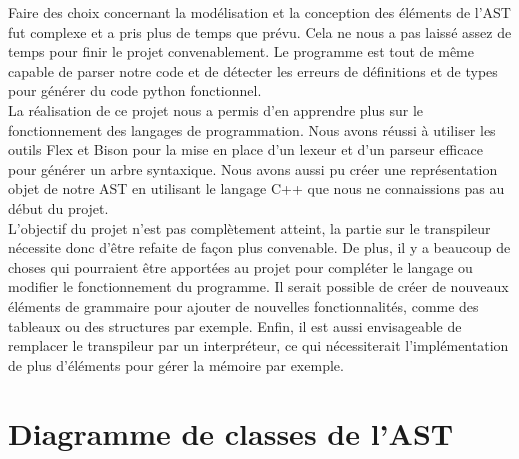 \documentclass[a4paper]{article}%
\begin{document}
Faire des choix concernant la modélisation et la conception des éléments de
l'AST fut complexe et a pris plus de temps que prévu. Cela ne nous a pas laissé
assez de temps pour finir le projet convenablement. Le programme est tout de
même capable de parser notre code et de détecter les erreurs de définitions et
de types pour générer du code python fonctionnel.\\

La réalisation de ce projet nous a permis d'en apprendre plus sur le
fonctionnement des langages de programmation. Nous avons réussi à utiliser les
outils Flex et Bison pour la mise en place d'un lexeur et d'un parseur efficace
pour générer un arbre syntaxique. Nous avons aussi pu créer une représentation
objet de notre AST en utilisant le langage C++ que nous ne connaissions pas au
début du projet.\\

L'objectif du projet n'est pas complètement atteint, la partie sur le
transpileur nécessite donc d'être refaite de façon plus convenable. De plus, il
y a beaucoup de choses qui pourraient être apportées au projet pour compléter le
langage ou modifier le fonctionnement du programme. Il serait possible de créer
de nouveaux éléments de grammaire pour ajouter de nouvelles fonctionnalités,
comme des tableaux ou des structures par exemple. Enfin, il est aussi
envisageable de remplacer le transpileur par un interpréteur, ce qui
nécessiterait l'implémentation de plus d'éléments pour gérer la mémoire par
exemple.

\normalsize

\clearpage{}
\pagestyle{empty}
\printbibliography[keyword={paper},title={Biliographie}]
\printbibliography[keyword={web},title={Webographie}]

\clearpage
\printglossaries

\appendix

\clearpage{}
\section{Diagramme de classes de l'AST}\label{appendix:classAST}
\end{document}
